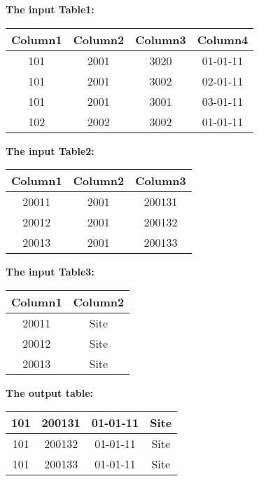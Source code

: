 \begin{figure}[t]

\textbf{The input Table1:}

\begin{tabular}{|c|c|c|c|}
\hline
 Column1 & Column2& Column3& Column4\\
 \hline
 101 &  2001 &  3020 &  01-01-11\\
\hline
 101 &  2001 &  3002 &  02-01-11\\
\hline
 101 &  2001 &  3001 &  03-01-11\\
\hline
 102 &  2002 &  3002 &  01-01-11\\
\hline
\end{tabular}

\vspace{2mm}

\textbf{The input Table2:}

\begin{tabular}{|c|c|c|}
\hline
 Column1 & Column2& Column3 \\
 \hline
 20011 &  2001 &  200131\\
\hline
 20012 &  2001 &  200132\\
\hline
 20013 &  2001 &  200133\\
\hline
\end{tabular}

\vspace{2mm}

\textbf{The input Table3:}

\begin{tabular}{|c|c|}
\hline
 Column1 & Column2\\
 \hline
 20011 &  Site\\
\hline
 20012 &  Site\\
\hline
 20013 &  Site\\
\hline
\end{tabular}

\vspace{3mm}

\textbf{The output table:}

\begin{tabular}{|c|c|c|c|}
\hline
 101 & 200131 & 01-01-11 & Site\\
 \hline
 101 & 200132 & 01-01-11 & Site\\
 \hline
 101 & 200133 & 01-01-11 & Site\\
 \hline
\end{tabular}
 \vspace{2mm}
\end{figure}

